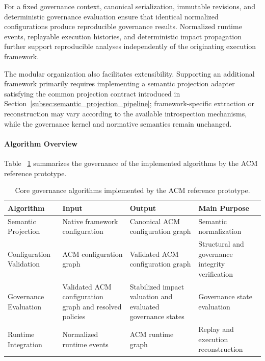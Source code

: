 \documentclass[10pt]{article}
\begin{document}
For a fixed governance context, canonical serialization, immutable revisions, and
deterministic governance evaluation ensure that identical normalized
configurations produce reproducible governance results. Normalized runtime
events, replayable execution histories, and deterministic impact propagation
further support reproducible analyses independently of the originating execution
framework.

The modular organization also facilitates extensibility. Supporting an
additional framework primarily requires implementing a semantic projection
adapter satisfying the common projection contract introduced in
Section~\ref{subsec:semantic_projection_pipeline}; framework-specific extraction
or reconstruction may vary according to the available introspection mechanisms,
while the governance kernel and normative semantics remain unchanged.

\paragraph{Algorithm Overview}
Table ~\ref{tab:governance_algorithms} summarizes the governance of the implemented algorithms by the ACM reference prototype.

\begin{table}[t]
	\centering
	\caption{Core governance algorithms implemented by the ACM reference prototype.}
	\label{tab:governance_algorithms}
	\small
	\renewcommand{\arraystretch}{1.15}
	\begin{tabularx}{\columnwidth}{>{\raggedright\arraybackslash}p{2.8cm}XX>{\raggedright\arraybackslash}p{2.6cm}}
		\toprule
		\textbf{Algorithm} &
		\textbf{Input} &
		\textbf{Output} &
		\textbf{Main Purpose} \\
		\midrule
		
		Semantic Projection &
		Native framework configuration &
		Canonical ACM configuration graph &
		Semantic normalization \\
		
		Configuration Validation &
		ACM configuration graph &
		Validated ACM configuration graph &
		Structural and governance integrity verification \\
		
		Governance Evaluation &
		Validated ACM configuration graph and resolved policies &
		Stabilized impact valuation and evaluated governance states &
		Governance state evaluation \\
		
		Runtime Integration &
		Normalized runtime events &
		ACM runtime graph &
		Replay and execution reconstruction \\
		
		\bottomrule
	\end{tabularx}
\end{table}
\end{document}
